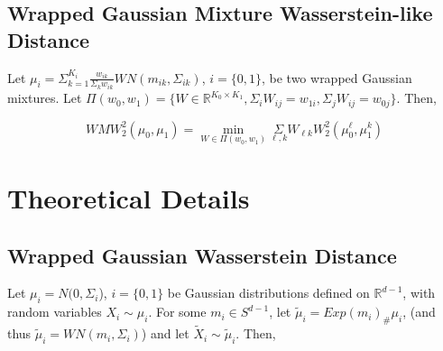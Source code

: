 \documentclass[]{article}
\begin{document}
\subsection{Wrapped Gaussian Mixture Wasserstein-like Distance}

Let $\mu_i = \Sigma_{k=1}^{K_i} \frac{w_{ik}}{\Sigma_k w_{ik}}WN(m_{ik},\Sigma_{ik})$, $i = \{0, 1\}$, be two wrapped Gaussian mixtures. Let $\Pi(w_0, w_1) = \{ W \in \mathbb{R}^{K_0 \times K_1}, \Sigma_i W_{ij} = w_{1i},\Sigma_j W_{ij} = w_{0j}\}$. Then,

%
%

\begin{equation*}
	WMW_2^2(\mu_0,\mu_1) = \underset{W \in \Pi(w_0,w_1)}{\min}  \underset{{\ell, k}}{\Sigma} W_{\ell k} W_2^2(\mu_0^\ell,\mu_1^k)
\end{equation*} 


\newpage

\section{Theoretical Details}\label{Section: theory}

%
%



\subsection{Wrapped Gaussian Wasserstein Distance}

Let $\mu_i = N(0,\Sigma_i$), $i = \{0,1\}$ be Gaussian distributions defined on $\mathbb{R}^{d-1}$, with random variables $X_i \sim \mu_i$. For some $m_i \in S^{d-1}$, let $\tilde{\mu}_i = Exp(m_i)_\#\mu_i$, (and thus $\tilde{\mu}_i = WN(m_i, \Sigma_i)$)   and let $\tilde{X}_i \sim \tilde{\mu}_i$. Then, 
\end{document}
